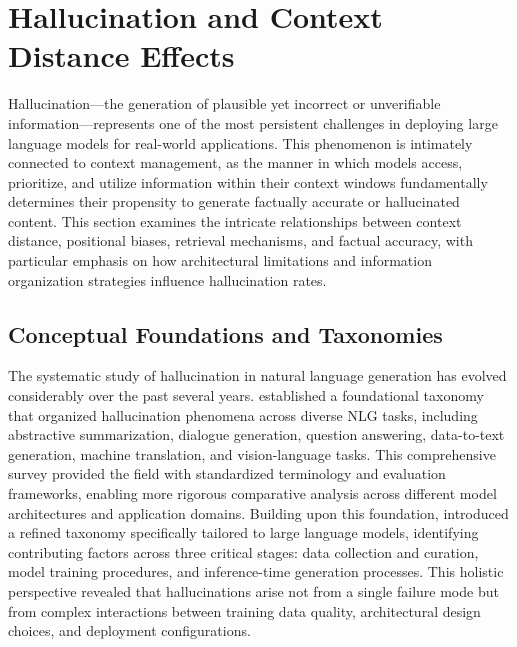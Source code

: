 \documentclass[11pt,letterpaper]{article}
\begin{document}
\section{Hallucination and Context Distance Effects}
\label{sec:hallucination}

Hallucination---the generation of plausible yet incorrect or unverifiable information---represents one of the most persistent challenges in deploying large language models for real-world applications. This phenomenon is intimately connected to context management, as the manner in which models access, prioritize, and utilize information within their context windows fundamentally determines their propensity to generate factually accurate or hallucinated content. This section examines the intricate relationships between context distance, positional biases, retrieval mechanisms, and factual accuracy, with particular emphasis on how architectural limitations and information organization strategies influence hallucination rates.

\subsection{Conceptual Foundations and Taxonomies}

The systematic study of hallucination in natural language generation has evolved considerably over the past several years. \cite{ji2023survey} established a foundational taxonomy that organized hallucination phenomena across diverse NLG tasks, including abstractive summarization, dialogue generation, question answering, data-to-text generation, machine translation, and vision-language tasks. This comprehensive survey provided the field with standardized terminology and evaluation frameworks, enabling more rigorous comparative analysis across different model architectures and application domains. Building upon this foundation, \cite{huang2023survey} introduced a refined taxonomy specifically tailored to large language models, identifying contributing factors across three critical stages: data collection and curation, model training procedures, and inference-time generation processes. This holistic perspective revealed that hallucinations arise not from a single failure mode but from complex interactions between training data quality, architectural design choices, and deployment configurations.
\end{document}
